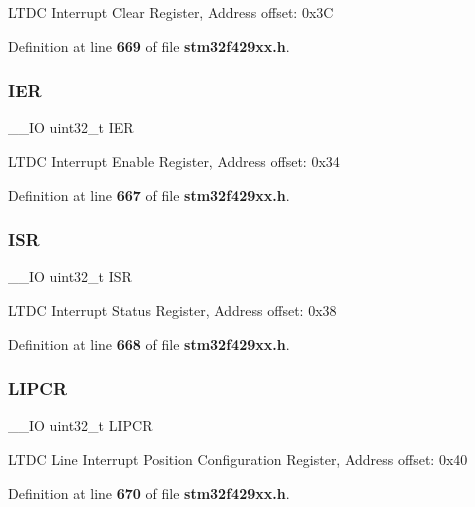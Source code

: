 L\+T\+DC Interrupt Clear Register, Address offset\+: 0x3C 

Definition at line \textbf{ 669} of file \textbf{ stm32f429xx.\+h}.

\mbox{\label{structLTDC__TypeDef_a6566f8cfbd1d8aa7e8db046aa35e77db}} 
\subsubsection{I\+ER}
{\footnotesize\ttfamily \+\_\+\+\_\+\+IO uint32\+\_\+t I\+ER}

L\+T\+DC Interrupt Enable Register, Address offset\+: 0x34 

Definition at line \textbf{ 667} of file \textbf{ stm32f429xx.\+h}.

\mbox{\label{structLTDC__TypeDef_ab3c49a96815fcbee63d95e1e74f20e75}} 
\subsubsection{I\+SR}
{\footnotesize\ttfamily \+\_\+\+\_\+\+IO uint32\+\_\+t I\+SR}

L\+T\+DC Interrupt Status Register, Address offset\+: 0x38 

Definition at line \textbf{ 668} of file \textbf{ stm32f429xx.\+h}.

\mbox{\label{structLTDC__TypeDef_a7d311d182e9cb4a5acd25f6bb3e1422d}} 
\subsubsection{L\+I\+P\+CR}
{\footnotesize\ttfamily \+\_\+\+\_\+\+IO uint32\+\_\+t L\+I\+P\+CR}

L\+T\+DC Line Interrupt Position Configuration Register, Address offset\+: 0x40 

Definition at line \textbf{ 670} of file \textbf{ stm32f429xx.\+h}.

\mbox{\label{structLTDC__TypeDef_a8be676577db129a84a9a2689519a8502}} 
